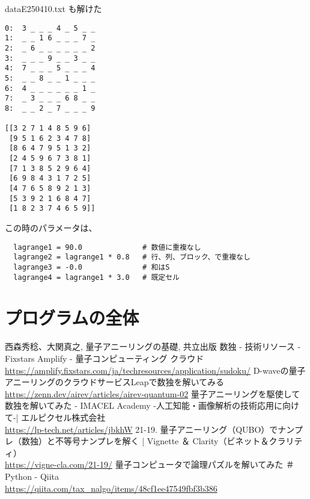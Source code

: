 \documentclass[uplatex,dvipdfmx,a4paper,11pt,oneside,openany]{jsbook}
\begin{document}
dataE250410.txt も解けた
\begin{verbatim}
0:	3 _ _ _ 4 _ 5 _ _
1:	_ _ 1 6 _ _ _ 7 _
2:	_ 6 _ _ _ _ _ _ 2
3:	_ _ _ 9 _ _ 3 _ _
4:	7 _ _ _ 5 _ _ _ 4
5:	_ _ 8 _ _ 1 _ _ _
6:	4 _ _ _ _ _ _ 1 _
7:	_ 3 _ _ _ 6 8 _ _
8:	_ _ 2 _ 7 _ _ _ 9

[[3 2 7 1 4 8 5 9 6]
 [9 5 1 6 2 3 4 7 8]
 [8 6 4 7 9 5 1 3 2]
 [2 4 5 9 6 7 3 8 1]
 [7 1 3 8 5 2 9 6 4]
 [6 9 8 4 3 1 7 2 5]
 [4 7 6 5 8 9 2 1 3]
 [5 3 9 2 1 6 8 4 7]
 [1 8 2 3 7 4 6 5 9]]
\end{verbatim}

この時のパラメータは、
\begin{verbatim}
  lagrange1 = 90.0              # 数値に重複なし
  lagrange2 = lagrange1 * 0.8   # 行、列、ブロック、で重複なし
  lagrange3 = -0.0              # 和はS
  lagrange4 = lagrange1 * 3.0   # 既定セル
\end{verbatim}

\section{プログラムの全体}



\begin{thebibliography}{9}
   西森秀稔、大関真之, 量子アニーリングの基礎, 共立出版
   数独 - 技術リソース - Fixstars Amplify - 量子コンピューティング クラウド\\ \url{https://amplify.fixstars.com/ja/techresources/application/sudoku/}
   D-waveの量子アニーリングのクラウドサービスLeapで数独を解いてみる\\
  \url{https://zenn.dev/airev/articles/airev-quantum-02}
   量子アニーリングを駆使して数独を解いてみた - IMACEL Academy -人工知能・画像解析の技術応用に向けて-| エルピクセル株式会社\\
\url{https://lp-tech.net/articles/jbkhW}
   21-19. 量子アニーリング（QUBO）でナンプレ（数独）と不等号ナンプレを解く | Vignette ＆ Clarity（ビネット＆クラリティ）\\
\url{https://vigne-cla.com/21-19/}
 量子コンピュータで論理パズルを解いてみた ＃Python - Qiita\\
\url{https://qiita.com/tax_nalgo/items/48cf1ee47549fbf3b386}
\end{thebibliography}
\end{document}
